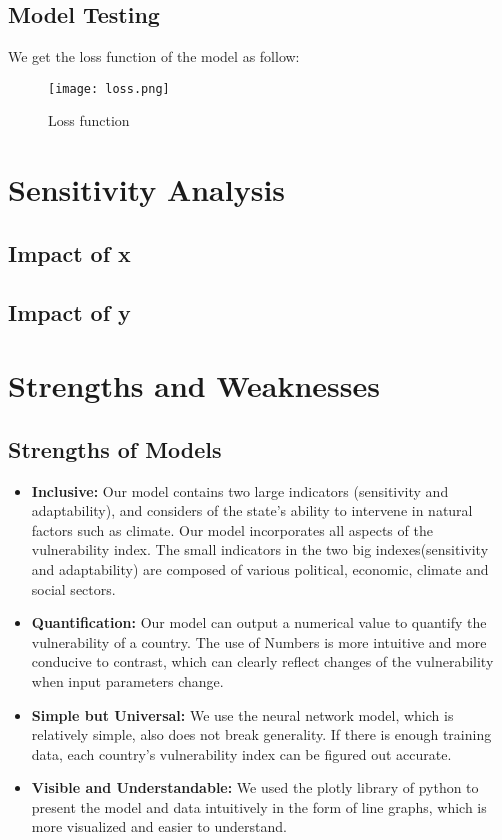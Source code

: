 \documentclass{mcmthesis}
\begin{document}
\subsection{Model Testing}
We get the loss function of the model as follow:\\
\begin{figure}[h]
\small
\centering
\texttt{[image: loss.png]}
\caption{Loss function} 
\label{fig:ns}
\end{figure}





\section{Sensitivity Analysis}
\subsection{Impact of x}
\subsection{Impact of y}

\section{Strengths and Weaknesses}
\subsection{Strengths of Models}
\begin{itemize}
  \item \textbf{Inclusive:} Our model contains two large indicators (sensitivity and adaptability), and 
  considers of the state's ability to intervene in natural factors such as climate. 
  Our model incorporates all aspects of the vulnerability index. The small indicators 
  in the two big indexes(sensitivity and adaptability) are composed of various political, 
  economic, climate and social sectors.
  \item \textbf{Quantification:} Our model can output a numerical value to quantify the vulnerability of a country. 
  The use of Numbers is more intuitive and more conducive to contrast, which can clearly 
  reflect changes of the vulnerability when input parameters change.
  \item \textbf{Simple but Universal:} We use the neural network model, which is relatively simple, also does not break 
  generality. If there is enough training data, each country's vulnerability index 
  can be figured out  accurate.
  \item \textbf{Visible and Understandable:} We used the plotly library of python to present the model and data 
  intuitively in the form of line graphs, which is more visualized and 
  easier to understand.
\end{itemize}
\end{document}
